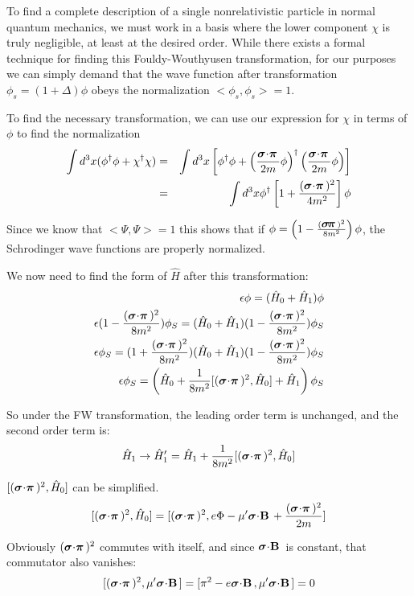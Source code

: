 To find a complete description of a single nonrelativistic particle in normal quantum mechanics, we must work in a basis where the lower component $\chi$ is truly negligible, at least at the desired order.  While there exists a formal technique for finding this Fouldy-Wouthyusen transformation, for our purposes we can simply demand that the wave function after transformation $\phi_s = (1 + \Delta)\phi$ obeys the normalization $<\phi_s, \phi_s> = 1$.

To find the necessary transformation, we can use our expression for $\chi$ in terms of $\phi$ to find the normalization
\begin{eqnarray*}
	\int d^3x (\phi^\dagger \phi + \chi^\dagger \chi) 	
		&=& \int d^3x 	\left[ \phi^\dagger \phi + \left (\frac{\sigdotg{\pi}}{2m} \phi \right)^\dagger
										   \left (\frac{\sigdotg{\pi}}{2m} \phi \right)
						\right ]	\\
		&=& \int d^3x 	\phi^\dagger \left[ 1 + \frac{ (\sigdotg{\pi})^2 }{4m^2} \right ] \phi
\end{eqnarray*}

Since we know that $<\Psi, \Psi>=1$ this shows that if $\phi = \left( 1 - \frac{ (\sigdotg{\pi})^2 }{8m^2} \right )\phi$, the Schrodinger wave functions are properly normalized.


We now need to find the form of $\hat{H}$ after this transformation:
\begin{eqnarray*}
\epsilon \phi = (\hat{H}_0 + \hat{H}_1) \phi \\ 
\epsilon (1 - \frac{(\sigdotg{\pi})^2}{8m^2})\phi_S =  (\hat{H}_0 + \hat{H}_1) (1 - \frac{(\sigdotg{\pi})^2}{8m^2})\phi_S \\
\epsilon \phi_S =  (1 + \frac{(\sigdotg{\pi})^2}{8m^2})(\hat{H}_0 + \hat{H}_1) (1 - \frac{(\sigdotg{\pi})^2}{8m^2})\phi_S \\
\epsilon \phi_S = \left (  \hat{H}_0 + \frac{1}{8m^2}[(\sigdotg{\pi})^2, \hat{H}_0] + \hat{H}_1 \right )\phi_S \\
\end{eqnarray*}

So under the FW transformation, the leading order term is unchanged, and the second order term is:
$$ \hat{H}_1 \to \hat{H}_1' = \hat{H}_1 + \frac{1}{8m^2}[(\sigdotg{\pi})^2, \hat{H}_0] $$

$ [(\sigdotg{\pi})^2, \hat{H}_0] $ can be simplified.  
$$[(\sigdotg{\pi})^2, \hat{H}_0] = [(\sigdotg{\pi})^2, e\Phi - \mu' \sigdot{B} + \frac {(\sigdotg{\pi})^2}{2m}]$$

Obviously $(\sigdotg{\pi})^2$ commutes with itself, and since $\sigdot{B}$ is constant, that commutator also vanishes:
$$[(\sigdotg{\pi})^2, \mu' \sigdot{B}] =[\pi^2 - e \sigdot{B}, \mu'\sigdot{B}] = 0 $$

